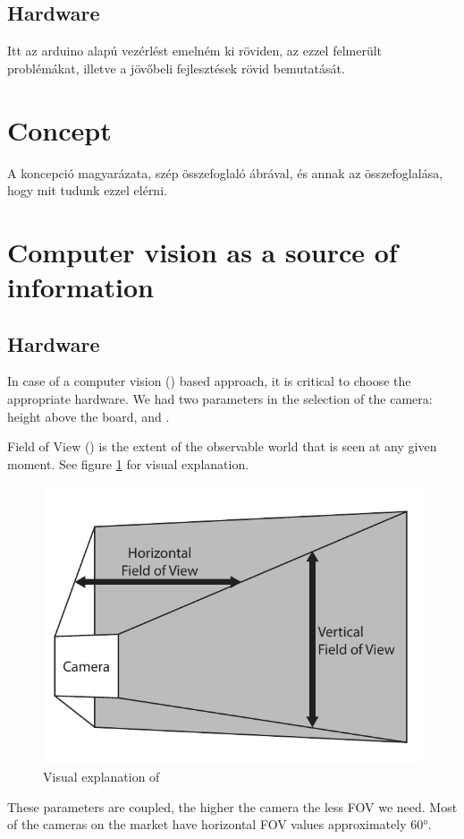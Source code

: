 	\subsection{Hardware}
	Itt az arduino alapú vezérlést emelném ki röviden, az ezzel felmerült problémákat, illetve a jövőbeli fejlesztések rövid bemutatását.

\section{Concept}
	A koncepció magyarázata, szép összefoglaló ábrával, és annak az összefoglalása, hogy mit tudunk ezzel elérni.

\section{Computer vision as a source of information}

\subsection{Hardware}

In case of a computer vision () based approach, it is critical to choose the appropriate hardware. We had two parameters in the selection of the camera: height above the board, and .

\begin{dfn}
	Field of View () is the extent of the observable world that is seen at any given moment. See figure \cref{fig:fov} for visual explanation.
\end{dfn}

\begin{figure}[h]
	\centering
	\label{fig:fov}
	\includegraphics[width=0.5\linewidth]{include/figures/chapter_6/opencv_1}
	\caption{Visual explanation of }
\end{figure}

These parameters are coupled, the higher the camera the less FOV we need. Most of the cameras on the market have horizontal FOV values approximately \ang{60}.


